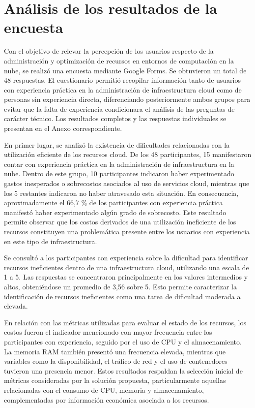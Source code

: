 \chapter{Análisis de los resultados de la encuesta}

Con el objetivo de relevar la percepción de los usuarios respecto de la
administración y optimización de recursos en entornos de computación en
la nube, se realizó una encuesta mediante Google Forms. Se obtuvieron un
total de 48 respuestas. El cuestionario permitió recopilar información
tanto de usuarios con experiencia práctica en la administración de
infraestructura cloud como de personas sin experiencia directa,
diferenciando posteriormente ambos grupos para evitar que la falta de
experiencia condicionara el análisis de las preguntas de carácter
técnico. Los resultados completos y las respuestas individuales se
presentan en el Anexo correspondiente.

En primer lugar, se analizó la existencia de dificultades relacionadas
con la utilización eficiente de los recursos cloud. De los 48
participantes, 15 manifestaron contar con experiencia práctica en la
administración de infraestructura en la nube. Dentro de este grupo, 10
participantes indicaron haber experimentado gastos inesperados o
sobrecostos asociados al uso de servicios cloud, mientras que los 5
restantes indicaron no haber atravesado esta situación. En consecuencia,
aproximadamente el 66,7 \% de los participantes con experiencia práctica
manifestó haber experimentado algún grado de sobrecosto. Este resultado
permite observar que los costos derivados de una utilización ineficiente
de los recursos constituyen una problemática presente entre los usuarios
con experiencia en este tipo de infraestructura.

Se consultó a los participantes con experiencia sobre la dificultad para
identificar recursos ineficientes dentro de una infraestructura cloud,
utilizando una escala de 1 a 5. Las respuestas se concentraron
principalmente en los valores intermedios y altos, obteniéndose un
promedio de 3,56 sobre 5. Esto permite caracterizar la identificación de
recursos ineficientes como una tarea de dificultad moderada a elevada.

En relación con las métricas utilizadas para evaluar el estado de los
recursos, los costos fueron el indicador mencionado con mayor frecuencia
entre los participantes con experiencia, seguido por el uso de CPU y el
almacenamiento. La memoria RAM también presentó una frecuencia elevada,
mientras que variables como la disponibilidad, el tráfico de red y el
uso de contenedores tuvieron una presencia menor. Estos resultados
respaldan la selección inicial de métricas consideradas por la solución
propuesta, particularmente aquellas relacionadas con el consumo de CPU,
memoria y almacenamiento, complementadas por información económica
asociada a los recursos.

